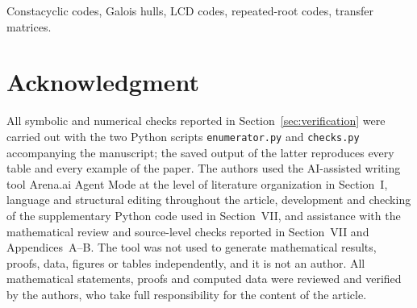 \documentclass[12pt,journal,draftclsnofoot,onecolumn]{IEEEtran}
\theoremstyle{definition}
\theoremstyle{remark}
\begin{document}
\begin{IEEEkeywords}
Constacyclic codes, Galois hulls, LCD codes, repeated-root codes, transfer
matrices.
\end{IEEEkeywords}



\section*{Acknowledgment}
All symbolic and numerical checks reported in Section~\ref{sec:verification}
were carried out with the two Python scripts \texttt{enumerator.py} and
\texttt{checks.py} accompanying the manuscript; the saved output of the latter
reproduces every table and every example of the paper.
The authors used the AI-assisted writing tool Arena.ai Agent Mode at the level
of literature organization in Section~I, language and structural editing
throughout the article, development and checking of the supplementary Python
code used in Section~VII, and assistance with the mathematical review and
source-level checks reported in Section~VII and Appendices~A--B. The tool was
not used to generate mathematical results, proofs, data, figures or tables
independently, and it is not an author. All mathematical statements, proofs and
computed data were reviewed and verified by the authors, who take full
responsibility for the content of the article.



\end{document}
